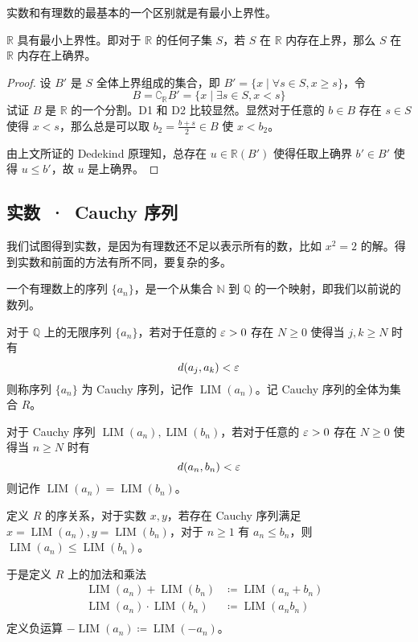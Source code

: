 实数和有理数的最基本的一个区别就是有最小上界性。

\begin{theorem}[确界原理]
	$\mathbb{R}$ 具有最小上界性。即对于 $\mathbb{R}$ 的任何子集 $S$，若 $S$ 在 $\mathbb{R}$ 内存在上界，那么 $S$ 在 $\mathbb{R}$ 内存在上确界。
\end{theorem}
\begin{proof}
	设 $B'$ 是 $S$ 全体上界组成的集合，即 $B' = \{x \mid\forall s \in S, x \geqslant s \}$，令
	\[ B = \complement_\mathbb{R} B' = \{ x \mid \exists s \in S, x < s\} \]
	试证 $B$ 是 $\mathbb{R}$ 的一个分割。D1 和 D2 比较显然。显然对于任意的 $b \in B$ 存在 $s \in S$ 使得 $x < s$，那么总是可以取 $b_2 = \frac{b+s}{2} \in B$ 使 $x < b_2$。

	由上文所证的 Dedekind 原理知，总存在 $u \in \mathbb{R}(B')$ 使得任取上确界 $b' \in B'$ 使得 $u \leqslant b'$，故 $u$ 是上确界。
\end{proof}

\subsection{实数\ ·\ Cauchy 序列}

\newcommand{\LIM}{\operatorname{{LIM}}}

我们试图得到实数，是因为有理数还不足以表示所有的数，比如 $x^2=2$ 的解。得到实数和前面的方法有所不同，要复杂的多。

一个有理数上的序列 $\{a_n\}$，是一个从集合 $\mathbb{N}$ 到 $\mathbb{Q}$ 的一个映射，即我们以前说的数列。

对于 $\mathbb{Q}$ 上的无限序列 $\{a_n\}$，若对于任意的 $\varepsilon > 0$ 存在 $N \geqslant 0$ 使得当 $j,k \geqslant N$ 时有
\[ d(a_j,a_k) < \varepsilon\]
则称序列 $\{a_n\}$ 为 Cauchy 序列，记作 $\LIM(a_n)$。记 Cauchy 序列的全体为集合 $R$。

对于 Cauchy 序列 $\LIM(a_n),\LIM(b_n)$，若对于任意的 $\varepsilon > 0$ 存在 $N \geqslant 0$ 使得当 $n \geqslant N$ 时有
\[ d(a_n,b_n) < \varepsilon\]
则记作 $\LIM(a_n) = \LIM(b_n)$。

定义 $R$ 的序关系，对于实数 $x,y$，若存在 Cauchy 序列满足 $x=\LIM(a_n),y=\LIM(b_n)$，对于 $n\geqslant 1$ 有 $a_n \leqslant b_n$，则 $\LIM(a_n) \leqslant \LIM(b_n)$。

于是定义 $R$ 上的加法和乘法
\[ \begin{aligned}
		\LIM(a_n) + \LIM(b_n)     & \coloneqq  \LIM(a_n+b_n) & \\
		\LIM(a_n) \cdot \LIM(b_n) & \coloneqq  \LIM(a_nb_n)    \\
	\end{aligned} \]
定义负运算 $-\LIM(a_n) \coloneqq  \LIM(-a_n)$。


